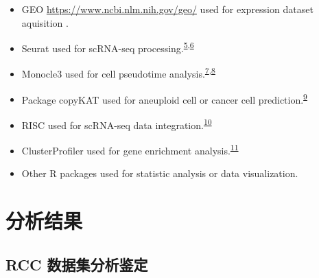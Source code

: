 \documentclass[
]{article}
\providecommand{\tightlist}{%
  \setlength{\itemsep}{0pt}\setlength{\parskip}{0pt}}
\begin{document}
\begin{itemize}
\tightlist
\item
  GEO \url{https://www.ncbi.nlm.nih.gov/geo/} used for expression dataset aquisition .
\item
  Seurat used for scRNA-seq processing.\textsuperscript{\protect\hyperlink{ref-IntegratedAnalHaoY2021}{5},\protect\hyperlink{ref-ComprehensiveIStuart2019}{6}}
\item
  Monocle3 used for cell pseudotime analysis.\textsuperscript{\protect\hyperlink{ref-ReversedGraphQiuX2017}{7},\protect\hyperlink{ref-TheDynamicsAnTrapne2014}{8}}
\item
  Package copyKAT used for aneuploid cell or cancer cell prediction.\textsuperscript{\protect\hyperlink{ref-DelineatingCopGaoR2021}{9}}
\item
  RISC used for scRNA-seq data integration.\textsuperscript{\protect\hyperlink{ref-RobustIntegratLiuY2021}{10}}
\item
  ClusterProfiler used for gene enrichment analysis.\textsuperscript{\protect\hyperlink{ref-ClusterprofilerWuTi2021}{11}}
\item
  Other R packages used for statistic analysis or data visualization.
\end{itemize}

\hypertarget{results}{%
\section{分析结果}\label{results}}

\hypertarget{res-rcc}{%
\subsection{RCC 数据集分析鉴定}\label{res-rcc}}
\end{document}
